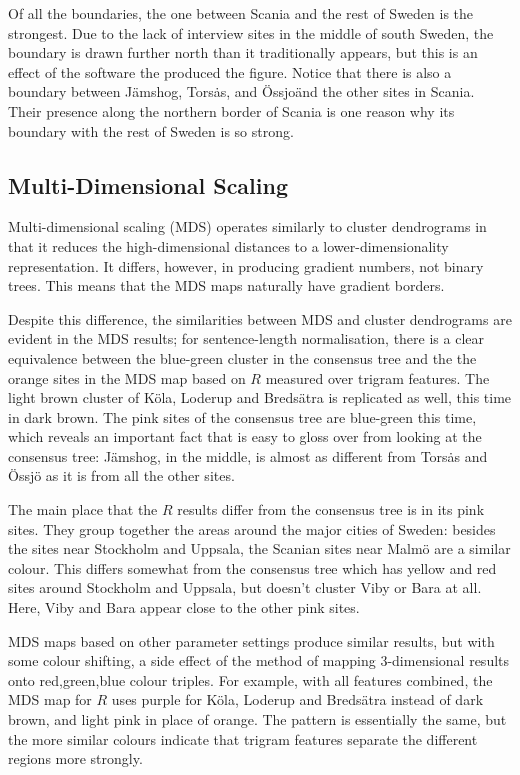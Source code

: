 Of all the boundaries, the one between Scania and the rest of Sweden
is the strongest. Due to the lack of interview sites in the middle of
south Sweden, the boundary is drawn further north than it
traditionally appears, but this is an effect of the software the
produced the figure. Notice that there is also a boundary between
J\"amshog, Tors\.as, and \"Ossjo\" and the other sites in
Scania. Their presence along the northern border of Scania is one
reason why its boundary with the rest of Sweden is so strong.

\subsection{Multi-Dimensional Scaling}

Multi-dimensional scaling (MDS) operates similarly to cluster
dendrograms in that it reduces the high-dimensional distances to a
lower-dimensionality representation. It differs, however, in producing
gradient numbers, not binary trees. This means that the MDS maps
naturally have gradient borders.

Despite this difference, the similarities between MDS and cluster
dendrograms are evident in the MDS results; for sentence-length
normalisation, there is a clear equivalence between the blue-green
cluster in the consensus tree and the the orange sites in the MDS map
based on $R$ measured over trigram features. The light brown cluster
of K\"ola, Loderup and Breds\"atra is replicated as well, this time in
dark brown. The pink sites of the consensus tree are blue-green this
time, which reveals an important fact that is easy to gloss over from
looking at the consensus tree: J\"amshog, in the middle, is almost as
different from Tors\.as and \"Ossj\"o as it is from all the other
sites.

The main place that the $R$ results differ from the consensus tree is
in its pink sites. They group together the areas around the
major cities of Sweden: besides the sites near Stockholm and Uppsala,
the Scanian sites near Malm\"o are a similar colour. This differs
somewhat from the consensus tree which has yellow and red sites around
Stockholm and Uppsala, but doesn't cluster Viby or Bara at all. Here,
Viby and Bara appear close to the other pink sites.

MDS maps based on other parameter settings produce similar results,
but with some colour shifting, a side effect of the method of mapping
3-dimensional results onto red,green,blue colour triples. For example,
with all features combined, the MDS map for $R$ uses purple for
K\"ola, Loderup and Breds\"atra instead of dark brown, and light pink
in place of orange. The pattern is essentially the same, but the
more similar colours indicate that trigram features separate
the different regions more strongly.

